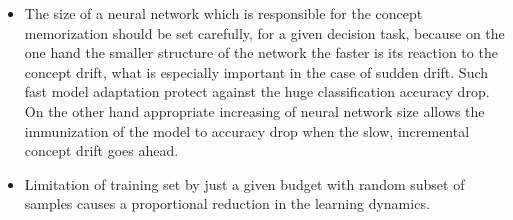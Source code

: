 \begin{itemize}
 \item The size of a neural network which is responsible for the concept memorization should be set carefully, for a given decision task, because on the one hand the smaller structure of the network the faster is its reaction to the concept drift, what is especially important in the case of sudden drift. Such fast model adaptation protect against the huge classification accuracy drop. On the other hand appropriate increasing of neural network size allows the immunization of the model to accuracy drop when the slow, incremental concept drift goes ahead. 
	\item Limitation of training set by just a given budget with random subset of samples causes a proportional reduction in the learning dynamics.
\end{itemize}

\label{subsec:exp:ll}